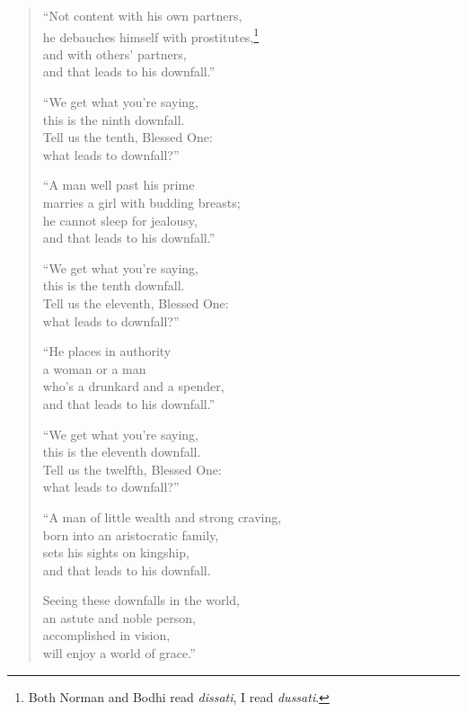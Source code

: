 \documentclass[12pt,openany]{book}%
\begin{document}
\begin{verse}
“Not content with his own partners, \\
he debauches himself with prostitutes,\footnote{Both Norman and Bodhi read \textit{dissati}, I read \textit{dussati}. } \\
and with others’ partners, \\
and that leads to his downfall.” 

“We get what you’re saying, \\
this is the ninth downfall. \\
Tell us the tenth, Blessed One: \\
what leads to downfall?” 

“A man well past his prime \\
marries a girl with budding breasts; \\
he cannot sleep for jealousy, \\
and that leads to his downfall.” 

“We get what you’re saying, \\
this is the tenth downfall. \\
Tell us the eleventh, Blessed One: \\
what leads to downfall?” 

“He places in authority \\
a woman or a man \\
who’s a drunkard and a spender, \\
and that leads to his downfall.” 

“We get what you’re saying, \\
this is the eleventh downfall. \\
Tell us the twelfth, Blessed One: \\
what leads to downfall?” 

“A man of little wealth and strong craving, \\
born into an aristocratic family, \\
sets his sights on kingship, \\
and that leads to his downfall. 

Seeing these downfalls in the world, \\
an astute and noble person, \\
accomplished in vision, \\
will enjoy a world of grace.” 

%
\end{verse}
\end{document}
